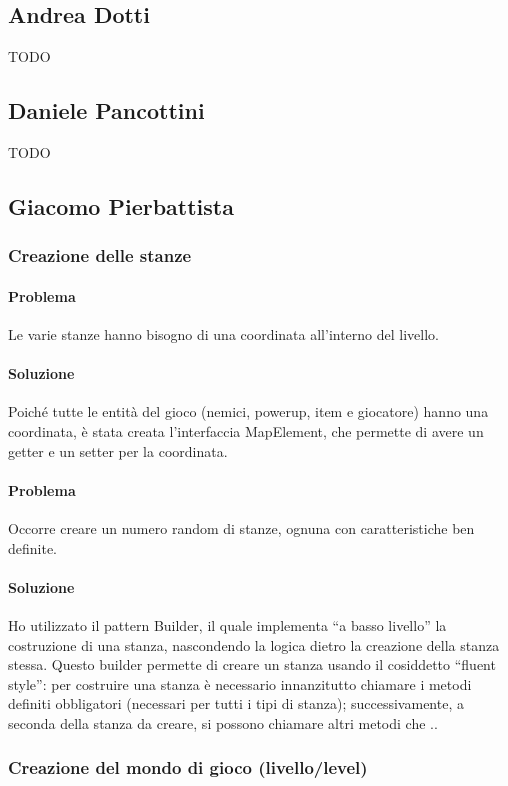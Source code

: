 \documentclass[a4paper,12pt]{report}
\begin{document}
\subsection*{Andrea Dotti}
{TODO}
\subsection*{Daniele Pancottini}
{TODO}


\subsection*{Giacomo Pierbattista}
\subsubsection{Creazione delle stanze}
\paragraph{Problema} Le varie stanze hanno bisogno di una coordinata all'interno del livello.
\paragraph{Soluzione} Poiché tutte le entità del gioco (nemici, powerup, item e giocatore) hanno una coordinata,
è stata creata l'interfaccia MapElement, che permette di avere un getter e un setter per la coordinata. 


\paragraph{Problema} Occorre creare un numero random di stanze, ognuna con caratteristiche ben definite.
\paragraph{Soluzione} Ho utilizzato il pattern Builder, il quale implementa ``a basso livello'' la costruzione
di una stanza, nascondendo la logica dietro la creazione della stanza stessa. Questo builder permette di creare 
un stanza usando il cosiddetto ``fluent style'': per costruire una stanza è necessario innanzitutto chiamare i metodi definiti
obbligatori (necessari per tutti i tipi di stanza); successivamente, a seconda della stanza da creare, si possono chiamare altri metodi
che ..

\subsubsection{Creazione del mondo di gioco (livello/level)}
\end{document}
